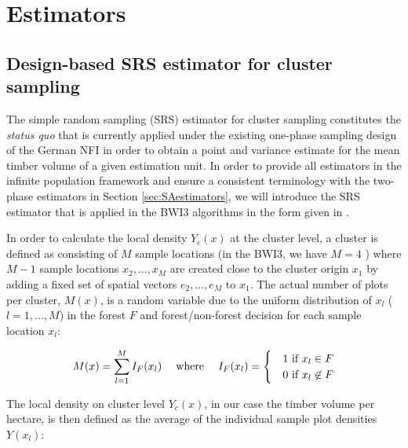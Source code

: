 \section{Estimators}
\label{sec:estimators}

\subsection{Design-based SRS estimator for cluster sampling}
\label{sec:srs_estimator}

The simple random sampling (SRS) estimator for cluster sampling constitutes the \textit{status quo} that is currently applied under the existing one-phase sampling design of the German NFI in order to obtain a point and variance estimate for the mean timber volume of a given estimation unit. In order to provide all estimators in the infinite population framework and ensure a consistent terminology with the two-phase estimators in Section \ref{sec:SAestimators}, we will introduce the SRS estimator that is applied in the BWI3 algorithms \citep{bwi3_ausw} in the form given in \citet{mandallaz2008, mandallaz2016}.\par 
In order to calculate the local density $Y_{c}(x)$ at the cluster level, a cluster is defined as consisting of $M$ sample locations (in the BWI3, we have $M=4$ ) where $M-1$ sample locations $x_2, ..., x_M$ are created close to the cluster origin $x_1$ by adding a fixed set of spatial vectors $e_2, ..., e_M$ to $x_1$. The actual number of plots per cluster, $M(x)$, is a random variable due to the uniform distribution of $x_l$ ($l=1, ..., M$) in the forest $F$ and forest/non-forest decision for each sample location $x_l$:

\begin{equation}\label{eq:Mx}
M(x)=\sum_{l=1}^{M}I_{F}(x_l) \hspace{3ex} \text{where} \hspace{3ex} I_F(x_l)=\begin{cases}&1 \text{ if $x_l \in F$}\\
&0 \text{ if $x_l\not\in F$}
\end{cases}
\end{equation}

The local density on cluster level $Y_{c}(x)$, in our case the timber volume per hectare, is then defined as the average of the individual sample plot densities $Y(x_l)$:

